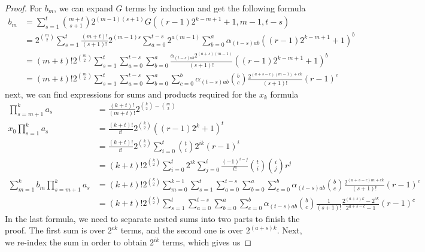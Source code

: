 \documentclass{article}
\begin{document}
\begin{proof}
For $b_m$, we can expand $G$ terms by induction and get the following formula
\begin{align*}
b_m &= \sum_{s=1}^{t}
       \binom{m+t}{s+1}2^{(m-1)(s+1)} G((r-1)2^{k-m+1}+1, m-1,t-s)\\
    &= 2^{\binom{m}{2}} 
       \sum_{s=1}^{t}
       \frac{(m+t)!}{(s+1)!}2^{(m-1)s}
         \sum_{a=0}^{t-s} 2^{a(m-1)}
           \sum_{b=0}^{a}
           \alpha_{(t-s)ab}((r-1)2^{k-m+1}+1)^b \\
    &= (m+t)!2^{\binom{m}{2}}
       \sum_{s=1}^{t}
         \sum_{a=0}^{t-s}
           \sum_{b=0}^{a}
           \frac{\alpha_{(t-s)ab}2^{(a+s)(m-1)}}{(s+1)!} ((r-1)2^{k-m+1}+1)^b \\
    &= (m+t)!2^{\binom{m}{2}}
       \sum_{s=1}^{t}
         \sum_{a=0}^{t-s}
           \sum_{b=0}^{a}
             \sum_{c=0}^{b}
             \alpha_{(t-s)ab}
             \binom{b}{c}
             \frac{2^{(a+s-c)(m-1)+ck}}{(s+1)!}(r-1)^c
\end{align*}
next, we can find expressions for sums and products required for the $x_k$ formula
\begin{align*}
\prod_{s=m+1}^{k}a_s
&=
   \frac{(k+t)!}{(m+t)!}
   2^{\binom{k}{2} - \binom{m}{2}} \\
x_0\prod_{s=1}^{k}a_s
&= 
   \frac{(k+t)!}{t!}
   2^{\binom{k}{2}} ((r-1)2^k+1)^t \\
&=
   \frac{(k+t)!}{t!}
   2^{\binom{k}{2}}
   \sum_{i=0}^{t}
     \binom{t}{i}
     2^{ik}
     (r-1)^i \\
&= (k+t)!
   2^{\binom{k}{2}}
   \sum_{i=0}^{t}
     2^{ik}
     \sum_{j=0}^{i}
       \frac{(-1)^{i-j}}{t!}
       \binom{t}{i}
       \binom{i}{j}
       r^j \\
\sum_{m=1}^{k} b_{m} \prod_{s=m+1}^{k}a_s
&=
  (k+t)!
  2^{\binom{k}{2}}
  \sum_{m=0}^{k-1}
    \sum_{s=1}^{t}
      \sum_{a=0}^{t-s}
        \sum_{b=0}^{a}
          \sum_{c=0}^{b}
          \alpha_{(t-s)ab}
          \binom{b}{c}
          \frac{2^{(a+s-c)m+ck}}{(s+1)!}(r-1)^c  \\
&=
  (k+t)!
  2^{\binom{k}{2}}
  \sum_{s=1}^{t}
    \sum_{a=0}^{t-s}
      \sum_{b=0}^{a}
        \sum_{c=0}^{b}
        \alpha_{(t-s)ab}
        \binom{b}{c}
        \frac{1}{(s+1)!}
        \frac{2^{(a+s)k}-2^{ck}}{2^{a+s-c}-1}
        (r-1)^c
\end{align*}
In the last formula, we need to separate nested sums into two parts to finish the proof. The first sum is over $2^{ck}$ terms, and the second one is over $2^{(a+s)k}$. Next, we re-index the sum in order to obtain $2^{ik}$ terms, which gives us

\end{proof}
\end{document}
